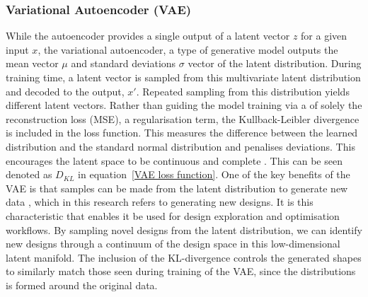 \documentclass{article}
\begin{document}
\subsubsection{Variational Autoencoder (VAE)}
While the autoencoder provides a single output of a latent vector \textbf{$z$} for a given input $x$, the variational autoencoder, a type of generative model outputs the mean vector $\mu$ and standard deviations $\sigma$ vector of the latent distribution. During training time, a latent vector is sampled from this multivariate latent distribution and decoded to the output, $x'$. Repeated sampling from this distribution yields different latent vectors. Rather than guiding the model training via a of solely the reconstruction loss (MSE), a regularisation term, the Kullback-Leibler divergence is included in the loss function. This measures the difference between the learned distribution and the standard normal distribution \citep{Huang2022} and penalises deviations. This encourages the latent space to be continuous and complete \citep{Lew2021}. This can be seen denoted as $D_{KL}$ in equation~\eqref{VAE loss function}. One of the key benefits of the VAE is that samples can be made from the latent distribution to generate new data \citep{Danhaive2022}, which in this research refers to generating new designs. It is this characteristic that enables it be used for design exploration and optimisation workflows. By sampling novel designs from the latent distribution, we can identify new designs through a continuum of the design space in this low-dimensional latent manifold. The inclusion of the KL-divergence controls the generated shapes to similarly match those seen during training of the VAE, since the distributions is formed around the original data.
\end{document}
